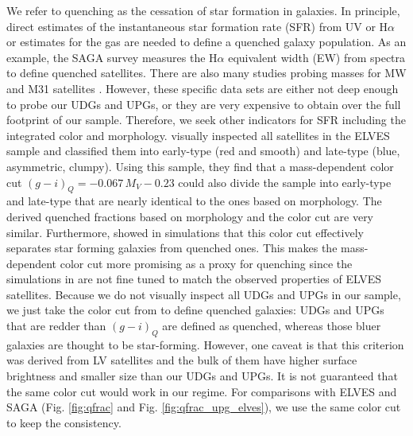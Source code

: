 \documentclass[twocolumn,astrosymb,twocolappendix]{aastex631}
\newcommand{\jiaxuan}[1]{\textcolor{orange}{\textbf{Jiaxuan: #1}}}
\begin{document}
\begin{CJK*}{UTF8}{gbsn}
We refer to quenching as the cessation of star formation in galaxies. In principle, direct estimates of the instantaneous star formation rate (SFR) from UV or H$\alpha$ or estimates for the  gas are needed to define a quenched galaxy population. As an example, the SAGA survey measures the H$\alpha$ equivalent width (EW) from spectra to define quenched satellites. There are also many studies probing  masses for MW and M31 satellites \citep[e.g.,][]{Grcevich2009,Spekkens2014,Putman2021}. However, these specific data sets are either not deep enough to probe our UDGs and UPGs, or they are very expensive to obtain over the full footprint of our sample. Therefore, we seek other indicators for SFR including the integrated color and morphology. \citet{CarlstenELVES2022} visually inspected all satellites in the ELVES sample and classified them into early-type (red and smooth) and late-type (blue, asymmetric, clumpy). Using this sample, they find that a mass-dependent color cut $(g-i)_{Q} = -0.067\, M_V - 0.23$ could also divide the sample into early-type and late-type that are nearly identical to the ones based on morphology. The derived quenched fractions based on morphology and the color cut are very similar. Furthermore, \citet{Font2022} showed in simulations that this color cut effectively separates star forming galaxies from quenched ones. This makes the mass-dependent color cut more promising as a proxy for quenching since the simulations in \citet{Font2022} are not fine tuned to match the observed properties of ELVES satellites. Because we do not visually inspect all UDGs and UPGs in our sample, we just take the color cut from \citet{CarlstenELVES2022} to define quenched galaxies: UDGs and UPGs that are redder than $(g-i)_Q$ are defined as quenched, whereas those bluer galaxies are thought to be star-forming. However, one caveat is that this criterion was derived from LV satellites and the bulk of them have higher surface brightness and smaller size than our UDGs and UPGs. It is not guaranteed that the same color cut would work in our regime. For comparisons with ELVES and SAGA (Fig. \ref{fig:qfrac} and Fig. \ref{fig:qfrac_upg_elves}), we use the same color cut to keep the consistency.


\end{CJK*}
\end{document}
